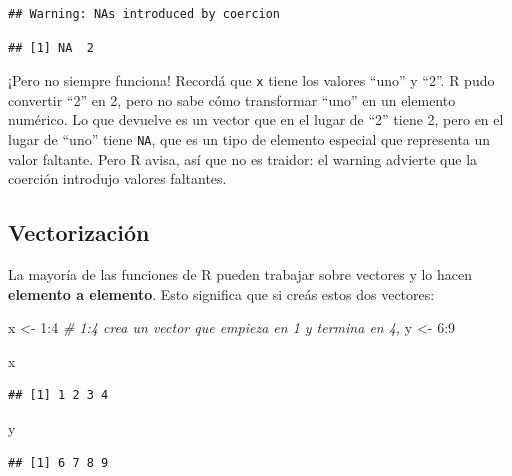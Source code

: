 \documentclass[
  openany]{book}
\newenvironment{Shaded}{\begin{snugshade}}{\end{snugshade}}
\newcommand{\CommentTok}[1]{\textcolor[rgb]{0.56,0.35,0.01}{\textit{#1}}}
\newcommand{\DecValTok}[1]{\textcolor[rgb]{0.00,0.00,0.81}{#1}}
\newcommand{\NormalTok}[1]{#1}
\newcommand{\OtherTok}[1]{\textcolor[rgb]{0.56,0.35,0.01}{#1}}
\newcommand{\SpecialCharTok}[1]{\textcolor[rgb]{0.00,0.00,0.00}{#1}}
\begin{document}
\begin{verbatim}
## Warning: NAs introduced by coercion
\end{verbatim}

\begin{verbatim}
## [1] NA  2
\end{verbatim}

¡Pero no siempre funciona!
Recordá que \texttt{x} tiene los valores ``uno'' y ``2''.
R pudo convertir ``2'' en 2, pero no sabe cómo transformar ``uno'' en un elemento numérico.
Lo que devuelve es un vector que en el lugar de ``2'' tiene 2, pero en el lugar de ``uno'' tiene \texttt{NA}, que es un tipo de elemento especial que representa un valor faltante.
Pero R avisa, así que no es traidor: el warning advierte que la coerción introdujo valores faltantes.

\hypertarget{vectorizaciuxf3n}{%
\subsection{Vectorización}\label{vectorizaciuxf3n}}

La mayoría de las funciones de R pueden trabajar sobre vectores y lo hacen \textbf{elemento a elemento}.
Esto significa que si creás estos dos vectores:

\begin{Shaded}
\begin{Highlighting}[]
\NormalTok{x }\OtherTok{\textless{}{-}} \DecValTok{1}\SpecialCharTok{:}\DecValTok{4}   \CommentTok{\# 1:4 crea un vector que empieza en 1 y termina en 4,}
\NormalTok{y }\OtherTok{\textless{}{-}} \DecValTok{6}\SpecialCharTok{:}\DecValTok{9}
\end{Highlighting}
\end{Shaded}

\begin{Shaded}
\begin{Highlighting}[]
\NormalTok{x}
\end{Highlighting}
\end{Shaded}

\begin{verbatim}
## [1] 1 2 3 4
\end{verbatim}

\begin{Shaded}
\begin{Highlighting}[]
\NormalTok{y}
\end{Highlighting}
\end{Shaded}

\begin{verbatim}
## [1] 6 7 8 9
\end{verbatim}
\end{document}
